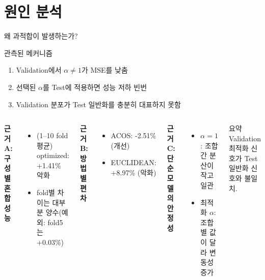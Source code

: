 \documentclass[aspectratio=169,10pt]{beamer}
\begin{document}
\section{원인 분석}

\begin{frame}{왜 과적합이 발생하는가?}
	\begin{block}{관측된 메커니즘}
		\begin{enumerate}
			\item Validation에서 \(\alpha\neq1\)가 MSE를 낮춤
			\item 선택된 \(\alpha\)를 Test에 적용하면 성능 저하 빈번
			\item Validation 분포가 Test 일반화를 충분히 대표하지 못함
		\end{enumerate}
	\end{block}

	\vspace{0.3em}
	\begin{columns}[T]
			\textbf{근거 A: 구성별 혼합 성능}
			\begin{itemize}
				\item (1--10 fold 평균) optimized: +1.41\% 악화
				\item fold별 차이는 대부분 양수(예외: fold5는 +0.03\%)
			\end{itemize}

			\textbf{근거 B: 방법별 편차}
			\begin{itemize}
				\item ACOS: -2.51\% (개선)
				\item EUCLIDEAN: +8.97\% (악화)
			\end{itemize}

			\textbf{근거 C: 단순 모델의 안정성}
			\begin{itemize}
				\item \(\alpha=1\): 조합 간 분산이 작고 일관
				\item 최적화 \(\alpha\): 조합별 값이 달라 변동성 증가
			\end{itemize}

			\begin{alertblock}{요약}
				Validation 최적화 신호가 Test 일반화 신호와 불일치.
			\end{alertblock}
	\end{columns}
\end{frame}
\end{document}
